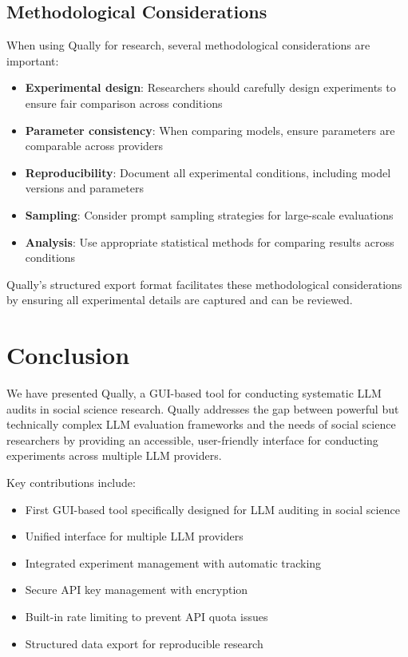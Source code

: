 \documentclass[11pt,a4paper]{article}
\begin{document}
\subsection{Methodological Considerations}

When using Qually for research, several methodological considerations are important:

\begin{itemize}
    \item \textbf{Experimental design}: Researchers should carefully design experiments to ensure fair comparison across conditions
    \item \textbf{Parameter consistency}: When comparing models, ensure parameters are comparable across providers
    \item \textbf{Reproducibility}: Document all experimental conditions, including model versions and parameters
    \item \textbf{Sampling}: Consider prompt sampling strategies for large-scale evaluations
    \item \textbf{Analysis}: Use appropriate statistical methods for comparing results across conditions
\end{itemize}

Qually's structured export format facilitates these methodological considerations by ensuring all experimental details are captured and can be reviewed.

\section{Conclusion}
\label{sec:conclusion}

We have presented Qually, a GUI-based tool for conducting systematic LLM audits in social science research. Qually addresses the gap between powerful but technically complex LLM evaluation frameworks and the needs of social science researchers by providing an accessible, user-friendly interface for conducting experiments across multiple LLM providers.

Key contributions include:
\begin{itemize}
    \item First GUI-based tool specifically designed for LLM auditing in social science
    \item Unified interface for multiple LLM providers
    \item Integrated experiment management with automatic tracking
    \item Secure API key management with encryption
    \item Built-in rate limiting to prevent API quota issues
    \item Structured data export for reproducible research
\end{itemize}
\end{document}
